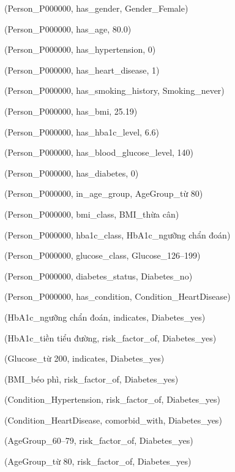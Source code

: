 (Person\_P000000, has\_gender, Gender\_Female)\par
(Person\_P000000, has\_age, 80.0)\par
(Person\_P000000, has\_hypertension, 0)\par
(Person\_P000000, has\_heart\_disease, 1)\par
(Person\_P000000, has\_smoking\_history, Smoking\_never)\par
(Person\_P000000, has\_bmi, 25.19)\par
(Person\_P000000, has\_hba1c\_level, 6.6)\par
(Person\_P000000, has\_blood\_glucose\_level, 140)\par
(Person\_P000000, has\_diabetes, 0)\par
(Person\_P000000, in\_age\_group, AgeGroup\_từ 80)\par
(Person\_P000000, bmi\_class, BMI\_thừa cân)\par
(Person\_P000000, hba1c\_class, HbA1c\_ngưỡng chẩn đoán)\par
(Person\_P000000, glucose\_class, Glucose\_126–199)\par
(Person\_P000000, diabetes\_status, Diabetes\_no)\par
(Person\_P000000, has\_condition, Condition\_HeartDisease)\par
(HbA1c\_ngưỡng chẩn đoán, indicates, Diabetes\_yes)\par
(HbA1c\_tiền tiểu đường, risk\_factor\_of, Diabetes\_yes)\par
(Glucose\_từ 200, indicates, Diabetes\_yes)\par
(BMI\_béo phì, risk\_factor\_of, Diabetes\_yes)\par
(Condition\_Hypertension, risk\_factor\_of, Diabetes\_yes)\par
(Condition\_HeartDisease, comorbid\_with, Diabetes\_yes)\par
(AgeGroup\_60–79, risk\_factor\_of, Diabetes\_yes)\par
(AgeGroup\_từ 80, risk\_factor\_of, Diabetes\_yes)\par
